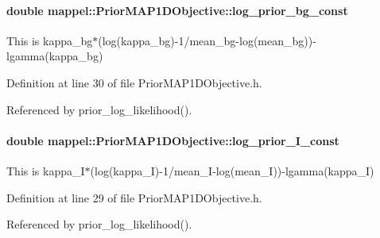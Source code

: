 \paragraph[{\texorpdfstring{log\+\_\+prior\+\_\+bg\+\_\+const}{log_prior_bg_const}}]{\setlength{\rightskip}{0pt plus 5cm}double mappel\+::\+Prior\+M\+A\+P1\+D\+Objective\+::log\+\_\+prior\+\_\+bg\+\_\+const\hspace{0.3cm}{\ttfamily [protected]}}\hypertarget{classmappel_1_1PriorMAP1DObjective_a101d01f84012e41cdd864d04a8dfc38f}{}\label{classmappel_1_1PriorMAP1DObjective_a101d01f84012e41cdd864d04a8dfc38f}
This is kappa\+\_\+bg$\ast$(log(kappa\+\_\+bg)-\/1/mean\+\_\+bg-\/log(mean\+\_\+bg))-\/lgamma(kappa\+\_\+bg) 

Definition at line 30 of file Prior\+M\+A\+P1\+D\+Objective.\+h.



Referenced by prior\+\_\+log\+\_\+likelihood().

\paragraph[{\texorpdfstring{log\+\_\+prior\+\_\+\+I\+\_\+const}{log_prior_I_const}}]{\setlength{\rightskip}{0pt plus 5cm}double mappel\+::\+Prior\+M\+A\+P1\+D\+Objective\+::log\+\_\+prior\+\_\+\+I\+\_\+const\hspace{0.3cm}{\ttfamily [protected]}}\hypertarget{classmappel_1_1PriorMAP1DObjective_a1cd270ee031e90604e7be0ddcce86026}{}\label{classmappel_1_1PriorMAP1DObjective_a1cd270ee031e90604e7be0ddcce86026}
This is kappa\+\_\+\+I$\ast$(log(kappa\+\_\+\+I)-\/1/mean\+\_\+\+I-\/log(mean\+\_\+I))-\/lgamma(kappa\+\_\+I) 

Definition at line 29 of file Prior\+M\+A\+P1\+D\+Objective.\+h.



Referenced by prior\+\_\+log\+\_\+likelihood().

